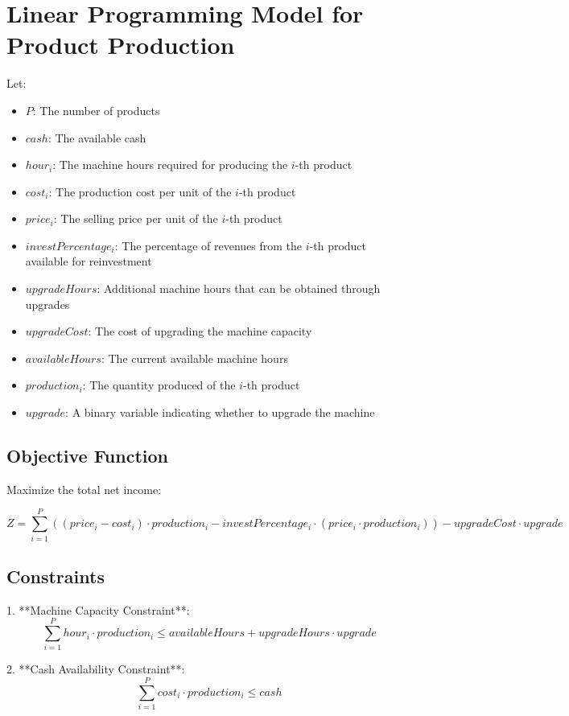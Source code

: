 \documentclass{article}
\begin{document}
\section*{Linear Programming Model for Product Production}

Let:
\begin{itemize}
    \item $P$: The number of products
    \item $cash$: The available cash
    \item $hour_i$: The machine hours required for producing the $i$-th product
    \item $cost_i$: The production cost per unit of the $i$-th product
    \item $price_i$: The selling price per unit of the $i$-th product
    \item $investPercentage_i$: The percentage of revenues from the $i$-th product available for reinvestment
    \item $upgradeHours$: Additional machine hours that can be obtained through upgrades
    \item $upgradeCost$: The cost of upgrading the machine capacity
    \item $availableHours$: The current available machine hours
    \item $production_i$: The quantity produced of the $i$-th product
    \item $upgrade$: A binary variable indicating whether to upgrade the machine
\end{itemize}

\subsection*{Objective Function}
Maximize the total net income:

\[
Z = \sum_{i=1}^{P} \left( (price_i - cost_i) \cdot production_i - investPercentage_i \cdot (price_i \cdot production_i) \right) - upgradeCost \cdot upgrade
\]

\subsection*{Constraints}

1. **Machine Capacity Constraint**:
\[
\sum_{i=1}^{P} hour_i \cdot production_i \leq availableHours + upgradeHours \cdot upgrade
\]

2. **Cash Availability Constraint**:
\[
\sum_{i=1}^{P} cost_i \cdot production_i \leq cash
\]
\end{document}
